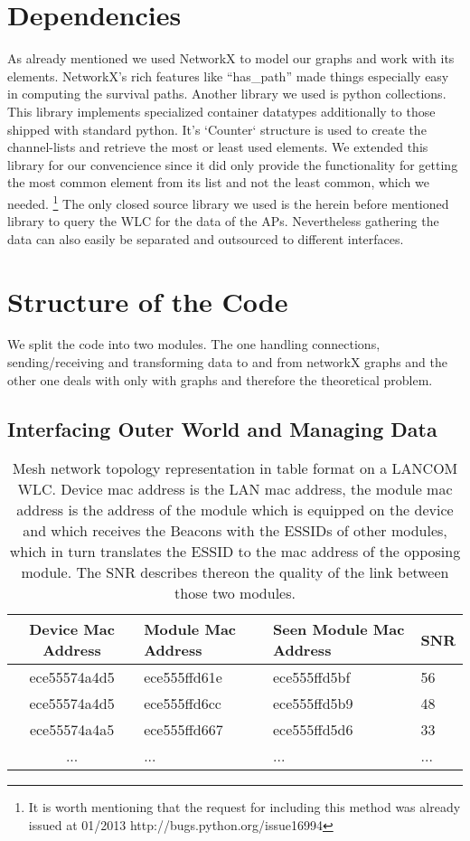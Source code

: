  \section{Dependencies}
    As already mentioned we used NetworkX\cite{hagberg-2008-exploring} to model our graphs and work with its elements.
    NetworkX's rich features like ``has\_path'' made things especially easy in computing the survival paths.
    Another library we used is python collections. \cite{python_collections}
    This library implements specialized container datatypes additionally to those shipped with standard python.
    It's `Counter` structure is used to create the channel-lists and retrieve the most or least used elements.
    We extended this library for our convencience since it did only provide the functionality for getting the most common element from its list and not the least common,
    which we needed. \footnote{It is worth mentioning that the request for including this method was already issued at 01/2013 http://bugs.python.org/issue16994}
    The only closed source library we used is the herein before mentioned library to query the WLC for the data of the APs. Nevertheless gathering the data can also
    easily be separated and outsourced to different interfaces.
  
  \section{Structure of the Code}
    We split the code into two modules. The one handling connections, sending/receiving and transforming data to and from networkX graphs and the other one 
    deals with only with graphs and therefore the theoretical problem.
    
    \subsection{Interfacing Outer World and Managing Data}      
     \begin{table}[h!]
	\begin{tabular}{clll}
	  Device Mac Address & Module Mac Address & Seen Module Mac Address & \ac{SNR}\\ \hline
	  ece55574a4d5 & ece555ffd61e & ece555ffd5bf & 56 \\
	  ece55574a4d5 & ece555ffd6cc & ece555ffd5b9 & 48 \\
	  ece55574a4a5 & ece555ffd667 & ece555ffd5d6 & 33 \\
	  ... & ... & ... & ...
	\end{tabular}
	\caption{Mesh network topology representation in table format on a LANCOM WLC. Device mac address is the LAN mac address, the module mac address is
	  the address of the module which is equipped on the device and which receives the Beacons with the ESSIDs of other modules, which in turn translates
	  the ESSID to the mac address of the opposing module. The \ac{SNR} describes thereon the quality of the link between those two modules.}
	\label{tab:wlc}
      \end{table}
      
